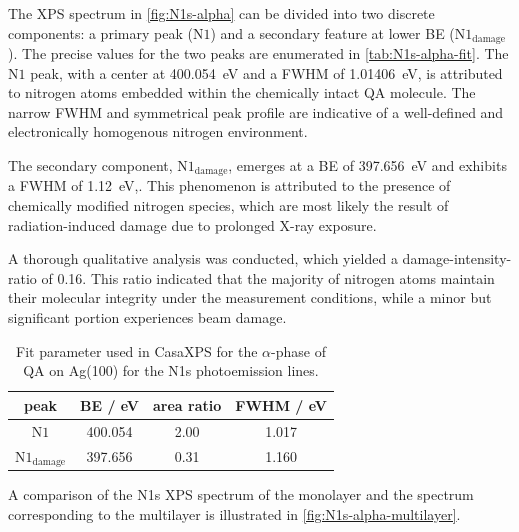 The \ac{XPS} spectrum in \autoref{fig:N1s-alpha} can be divided into two discrete components: a primary peak ($\mathrm{N1}$) and a secondary feature at lower \ac{BE} ($\mathrm{N1_{damage}}$). The precise values for the two peaks are enumerated in \autoref{tab:N1s-alpha-fit}. The $\mathrm{N1}$ peak, with a center at 400.054~\si{\eV} and a \ac{FWHM} of 1.01406~\si{\eV}, is attributed to nitrogen atoms embedded within the chemically intact \ac{QA} molecule. The narrow \ac{FWHM} and symmetrical peak profile are indicative of a well-defined and electronically homogenous nitrogen environment.

The secondary component, $\mathrm{N1_{damage}}$, emerges at a \ac{BE} of 397.656~\si{\eV} and exhibits a \ac{FWHM} of 1.12~\si{\eV},. This phenomenon is attributed to the presence of chemically modified nitrogen species, which are most likely the result of radiation-induced damage due to prolonged X-ray exposure.

A thorough qualitative analysis was conducted, which yielded a damage-intensity-ratio of 0.16. This ratio indicated that the majority of nitrogen atoms maintain their molecular integrity under the measurement conditions, while a minor but significant portion experiences beam damage.

\begin{table}[H]
	\centering
	\caption{Fit parameter used in CasaXPS\autocite{CASA2022} for the $\alpha$-phase of \ac{QA} on Ag(100) for the N1s photoemission lines.}
	\begin{tabular}{|c|c|c|c|}
		\hline
		peak & \ac{BE} / eV & area ratio & FWHM / eV \\
		\hline
		$\mathrm{N1}$ & 400.054 & 2.00 & 1.017 \\ \hline
		$\mathrm{N1_{damage}}$ & 397.656 & 0.31 & 1.160 \\ \hline
	\end{tabular}
	\label{tab:N1s-alpha-fit}
\end{table}

A comparison of the N1s \ac{XPS} spectrum of the monolayer and the spectrum corresponding to the multilayer is illustrated in \autoref{fig:N1s-alpha-multilayer}.

